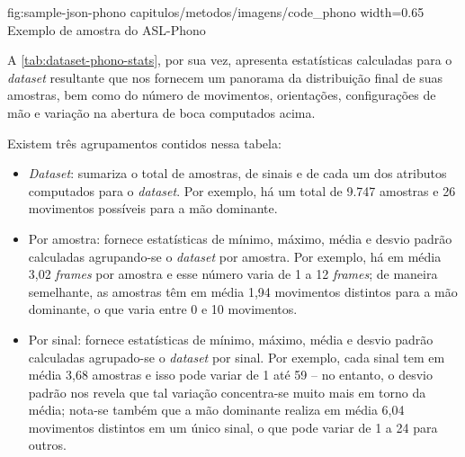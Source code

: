 \figura
{fig:sample-json-phono} %
{capitulos/metodos/imagens/code_phono} %
{width=0.65\linewidth} %
{Exemplo de amostra do ASL-Phono} %
{} %


A \autoref{tab:dataset-phono-stats}, por sua vez, apresenta estatísticas calculadas para o \textit{dataset} resultante que nos fornecem um panorama da distribuição final de suas amostras, bem como do número de movimentos, orientações, configurações de mão e variação na abertura de boca computados acima.




Existem três agrupamentos contidos nessa tabela:

\begin{itemize}
    \item \textit{Dataset}: sumariza o total de amostras, de sinais e de cada um dos atributos computados para o \textit{dataset}.
          Por exemplo, há um total de 9.747 amostras e 26 movimentos possíveis para a mão dominante.

    \item Por amostra: fornece estatísticas de mínimo, máximo, média e desvio padrão calculadas agrupando-se o \textit{dataset} por amostra.
          Por exemplo, há em média 3,02 \textit{frames} por amostra e esse número varia de 1 a 12 \textit{frames}; de maneira semelhante, as amostras têm em média 1,94 movimentos distintos para a mão dominante, o que varia entre 0 e 10 movimentos.


    \item Por sinal: fornece estatísticas de mínimo, máximo, média e desvio padrão calculadas agrupado-se o \textit{dataset} por sinal.
          Por exemplo, cada sinal tem em média 3,68 amostras e isso pode variar de 1 até 59 -- no entanto, o desvio padrão nos revela que tal variação concentra-se muito mais em torno da média; nota-se também que a mão dominante realiza em média 6,04 movimentos distintos em um único sinal, o que pode variar de 1 a 24 para outros.

\end{itemize}


